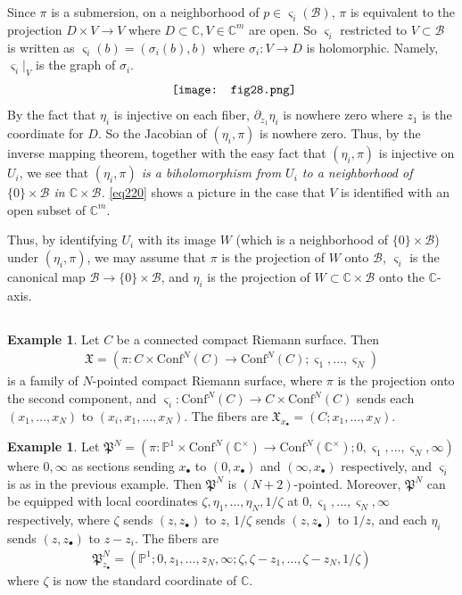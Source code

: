 \documentclass[11pt,b5paper,notitlepage]{article}
\theoremstyle{definition}
\newtheorem{eg}[df]{Example}
\theoremstyle{plain}
\newcommand{\fk}{\mathfrak}
\newcommand{\mc}{\mathcal}
\newcommand{\Conf}{\mathrm{Conf}}
\newcommand{\sgm}{\varsigma}
\newcommand{\blt}{\bullet}
\newcommand{\Cbb}{\mathbb C}
\newcommand{\Pbb}{\mathbb P}
\numberwithin{equation}{section}
\begin{document}
Since $\pi$ is a submersion, on a neighborhood of $p\in\sgm_i(\mc B)$, $\pi$ is equivalent to the projection $D\times V\rightarrow V$ where $D\subset\Cbb,V\in\Cbb^m$ are open. So $\sgm_i$ restricted to $V\subset\mc B$ is written as
 $\sgm_i(b)=(\sigma_i(b),b)$ where $\sigma_i:V\rightarrow D$ is holomorphic. Namely, $\sgm_i|_V$ is the graph of $\sigma_i$.
\begin{align}\label{eq220}
\vcenter{\hbox{{
\texttt{[image: fig28.png]}}}}
\end{align}
By the fact that $\eta_i$ is injective on each fiber, $\partial_{z_1}\eta_i$ is nowhere zero where $z_1$ is the coordinate for $D$. So the Jacobian of $(\eta_i,\pi)$ is nowhere zero. Thus, by the inverse mapping theorem, together with the easy fact that $(\eta_i,\pi)$ is injective on $U_i$, we see that \emph{$(\eta_i,\pi)$ is a biholomorphism from $U_i$ to a neighborhood of $\{0\}\times\mc B$ in $\Cbb\times\mc B$.} \eqref{eq220} shows a picture in the case that $V$ is identified with an open subset of $\Cbb^m$.

Thus, by identifying $U_i$ with its image $W$ (which is a neighborhood of $\{0\}\times\mc B$) under $(\eta_i,\pi)$, we may assume that $\pi$ is the projection of $W$  onto $\mc B$, $\sgm_i$ is the canonical map $\mc B\rightarrow\{0\}\times\mc B$, and $\eta_i$ is the projection of $W\subset\Cbb\times\mc B$ onto the $\Cbb$-axis.



\subsection{}

\begin{eg}
Let $C$ be a connected compact Riemann surface. Then
\begin{align*}
\fk X=(\pi:C\times\Conf^N(C)\rightarrow \Conf^N(C);\sgm_1,\dots,\sgm_N)
\end{align*}
is a family of $N$-pointed compact Riemann surface, where $\pi$ is the projection onto the second component, and $\sgm_i:\Conf^N(C)\rightarrow C\times \Conf^N(C)$ sends each $(x_1,\dots,x_N)$ to $(x_i,x_1,\dots,x_N)$. The fibers are $\fk X_{x_\blt}=(C;x_1,\dots,x_N)$.
\end{eg}

\begin{eg}\label{lb118}
Let $\fk P^N=(\pi:\Pbb^1\times\Conf^N(\Cbb^\times)\rightarrow\Conf^N(\Cbb^\times);0,\sgm_1,\dots,\sgm_N,\infty)$ where $0,\infty$ as sections sending $x_\blt$ to  $(0,x_\blt)$ and $(\infty,x_\blt)$ respectively, and $\sgm_i$ is as in the previous example. Then $\fk P^N$ is $(N+2)$-pointed. Moreover, $\fk P^N$ can be equipped with local coordinates $\zeta,\eta_1,\dots,\eta_N,1/\zeta$ at $0,\sgm_1,\dots,\sgm_N,\infty$ respectively, where $\zeta$ sends $(z,z_\blt)$ to $z$, $1/\zeta$ sends $(z,z_\blt)$ to $1/z$, and each $\eta_i$ sends $(z,z_\blt)$ to $z-z_i$. The fibers are
\begin{align*}
\fk P^N_{z_\blt}=(\Pbb^1;0,z_1,\dots,z_N,\infty;\zeta,\zeta-z_1,\dots,\zeta-z_N,1/\zeta)
\end{align*}
where $\zeta$ is now the standard coordinate of $\Cbb$.
\end{eg}
\end{document}
